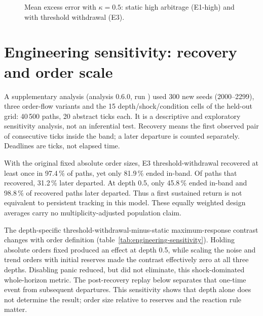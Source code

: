 \begin{figure}[htbp]
\centering
{}
\caption{Mean excess error with $\kappa=0.5$: static high arbitrage (E1-high) and with threshold withdrawal (E3).}
\label{fig:prof}
\end{figure}

\section{Engineering sensitivity: recovery and order scale}
\label{sec:engineering-sensitivity}

A supplementary analysis (analysis 0.6.0, run \code{\EngineeringRunID}) used 300 new seeds (2000--2299), three order-flow variants and the 15 depth/shock/condition cells of the held-out grid: 40\,500 paths, 20 abstract ticks each. It is a descriptive and exploratory sensitivity analysis, not an inferential test. Recovery means the first observed pair of consecutive ticks inside the band; a later departure is counted separately. Deadlines are ticks, not elapsed time.

With the original fixed absolute order sizes, E3 threshold-withdrawal recovered at least once in 97.4\,\% of paths, yet only 81.9\,\% ended in-band. Of paths that recovered, 31.2\,\% later departed. At depth 0.5, only 45.8\,\% ended in-band and 98.8\,\% of recovered paths later departed. Thus a first sustained return is not equivalent to persistent tracking in this model. These equally weighted design averages carry no multiplicity-adjusted population claim.

The depth-specific threshold-withdrawal-minus-static maximum-response contrast changes with order definition (table~\ref{tab:engineering-sensitivity}). Holding absolute orders fixed produced an effect at depth 0.5, while scaling the noise and trend orders with initial reserves made the contrast effectively zero at all three depths. Disabling panic reduced, but did not eliminate, this shock-dominated whole-horizon metric. The post-recovery replay below separates that one-time event from subsequent departures. This sensitivity shows that depth alone does not determine the result; order size relative to reserves and the reaction rule matter.

